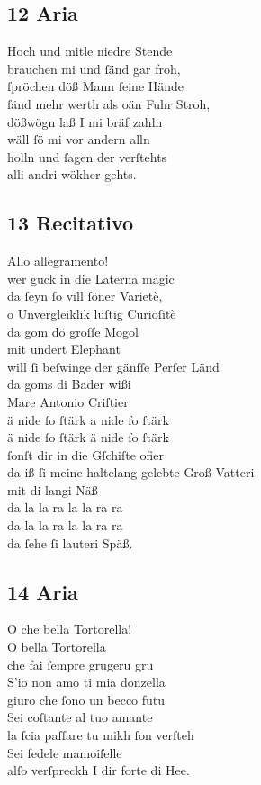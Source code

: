 \documentclass{ees}
\newenvironment{lyrics}[1]{%
  \subsection{#1}\nopagebreak%
  \begin{lyricslist}%
  \let\voice\item%
}{%
  \end{lyricslist}%
}
\begin{document}
\newpage
\begin{lyrics}{12 Aria}
  \voice[Sagfäller]
  Hoch und mitle niedre Stende\\
  brauchen mi und ſänd gar froh,\\
  ſpröchen döß Mann ſeine Hände\\
  ſänd mehr werth als oän Fuhr Stroh,\\
  dößwögn laß I mi bräf zahln\\
  wäll ſö mi vor andern alln\\
  holln und ſagen der verſtehts\\
  alli andri wökher gehts.
\end{lyrics}

\begin{lyrics}{13 Recitativo}
  \voice[Savoiard]
  Allo allegramento!\\
  wer guck in die Laterna magic\\
  da ſeyn ſo vill ſöner Varietè,\\
  o Unvergleiklik luſtig Curioſitè\\
  da gom dö groſſe Mogol\\
  mit undert Elephant\\
  will ſi beſwinge der gänſſe Perſer Länd\\
  da goms di Bader wißi\\
  Mare Antonio Criſtier\\
  ä nide ſo ſtärk a nide ſo ſtärk\\
  ä nide ſo ſtärk ä nide ſo ſtärk\\
  ſonſt dir in die Gſchiſte ofier\\
  da iß ſi meine haltelang gelebte Groß-Vatteri\\
  mit di langi Näß\\
  da la la ra la la ra ra\\
  da la la ra la la ra ra\\
  da ſehe ſi lauteri Späß.
\end{lyrics}

\begin{lyrics}{14 Aria}
  \voice[Savoiard]
  O che bella Tortorella!\\
  O bella Tortorella\\
  che fai ſempre grugeru gru\\
  S’io non amo ti mia donzella\\
  giuro che ſono un becco futu\\
  Sei coſtante al tuo amante\\
  la ſcia paſſare tu mikh ſon verſteh\\
  Sei fedele mamoiſelle\\
  alſo verſpreckh I dir forte di Hee.
\end{lyrics}
\end{document}
